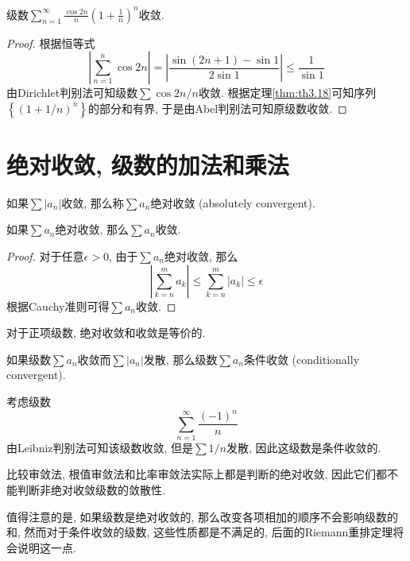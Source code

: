 \documentclass[cn,12pt,math=mtpro2,citestyle=gb7714-2015,bibstyle=gb7714-2015,twocol]{elegantbook}
\begin{document}
\begin{example}
级数$\sum_{n=1}^{\infty}\frac{\cos 2n}{n}\left(1+\frac{1}{n}\right)^n$收敛.
\end{example}
\begin{proof}
  根据恒等式
  $$\left|\sum_{n=1}^{n}\cos 2n\right|=\left|\frac{\sin(2n+1)-\sin1}{2\sin1}\right|\leq\frac{1}{\sin1}$$
  由Dirichlet判别法可知级数$\sum \cos2n/n$收敛. 根据定理\ref{thm:th3.18}可知序列$\left\{\left(1+1/n\right)^n\right\}$的部分和有界, 于是由Abel判别法可知原级数收敛.
\end{proof}

\section{绝对收敛, 级数的加法和乘法}
\begin{definition}
如果$\sum |a_n|$收敛, 那么称$\sum a_n$绝对收敛 (absolutely convergent).
\end{definition}
\begin{theorem}
  如果$\sum a_n$绝对收敛, 那么$\sum a_n$收敛.
\end{theorem}
\begin{proof}
  对于任意$\epsilon>0$, 由于$\sum a_n$绝对收敛, 那么
  $$\left|\sum_{k=n}^{m}a_k\right|\leq\sum_{k=n}^{m}|a_k|\leq\epsilon$$
  根据Cauchy准则可得$\sum a_n$收敛.


\end{proof}
\begin{remark}
对于正项级数, 绝对收敛和收敛是等价的.
\end{remark}
\begin{definition}
如果级数$\sum a_n$收敛而$\sum |a_n|$发散, 那么级数$\sum a_n$条件收敛 (conditionally convergent).
\end{definition}
\begin{example}
考虑级数
$$\sum_{n=1}^{\infty}\frac{(-1)^n}{n}$$
由Leibniz判别法可知该级数收敛, 但是$\sum 1/n$发散, 因此这级数是条件收敛的.
\end{example}
比较审敛法, 根值审敛法和比率审敛法实际上都是判断的绝对收敛, 因此它们都不能判断非绝对收敛级数的敛散性.

值得注意的是, 如果级数是绝对收敛的, 那么改变各项相加的顺序不会影响级数的和, 然而对于条件收敛的级数, 这些性质都是不满足的, 后面的Riemann重排定理将会说明这一点.
\end{document}
